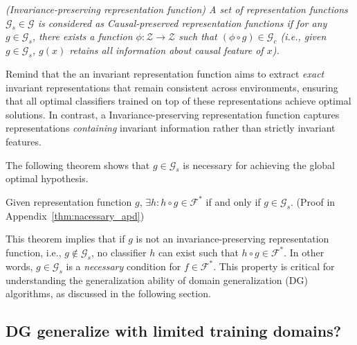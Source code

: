 
\begin{definition}\textit{(Invariance-preserving representation function) A set of representation functions $\mathcal{G}_s\in \mathcal{G}$ is considered as Causal-preserved representation functions if for any $g\in\mathcal{G}_s$, there exists a function $\phi: \mathcal{Z}\rightarrow \mathcal{Z}$ such that
$(\phi\circ g) \in \mathcal{G}_c$ (i.e., given $g\in \mathcal{G}_s$, $g(x)$ retains all information about causal feature of $x$). }
\label{def:sufficient}
\end{definition}
\color{black}

Remind that the an invariant representation function aims to extract \textit{exact} invariant representations that remain consistent across environments, ensuring that all optimal classifiers trained on top of these representations achieve optimal solutions. In contrast, a Invariance-preserving representation function captures representations \textit{containing} invariant information rather than strictly invariant features.

The following theorem shows that $g \in \mathcal{G}_s$ is necessary for achieving the global optimal hypothesis. 

\begin{theorem} Given representation function $g$,
$\exists h: h\circ g\in \mathcal{F}^*$ if and only if $g\in \mathcal{G}_s$. (Proof in Appendix~\ref{thm:nacessary_apd})
\label{thm:nacessary}
\end{theorem}

This theorem implies that if $g$ is not an invariance-preserving representation function, i.e., $g \notin \mathcal{G}_s$, no classifier $h$ can exist such that $h \circ g \in \mathcal{F}^*$. In other words, $g \in \mathcal{G}_s$ is a \textit{necessary} condition for $f \in \mathcal{F}^*$. This property is critical for understanding the generalization ability of domain generalization (DG) algorithms, as discussed in the following section.




\subsection{DG generalize with limited training domains?}
\label{sec:efficacy_DG}

